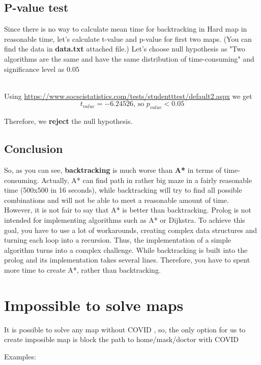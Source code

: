 \documentclass{article}
\newcommand{\C}{COVID }
\begin{document}
\subsection{P-value test}
Since there is no way to calculate mean time for backtracking in Hard map in reasonable time, let's calculate t-value and p-value for first two maps. (You can find the data in \textbf{data.txt} attached file.)
Let's choose null hypothesis as "Two algorithms are the same and have the same distribution of time-consuming" and significance level as $0.05$

\\
Using \url{https://www.socscistatistics.com/tests/studentttest/default2.aspx} we get $$t_{value} = -6.24526 \text{, so }p_{value} < 0.05$$

Therefore, we \textbf{reject} the null hypothesis.

\subsection{Conclusion}

So, as you can see, \textbf{backtracking} is much worse than \textbf{A*} in terms of time-consuming. Actually, A* can find path in rather big maze in a fairly reasonable time (500x500 in 16 seconds), while backtracking will try to find all possible combinations and will not be able to meet a reasonable amount of time.
\\
However, it is not fair to say that A* is better than backtracking. Prolog is not intended for implementing algorithms such as A* or Dijkstra. To achieve this goal, you have to use a lot of workarounds, creating complex data structures and turning each loop into a recursion. Thus, the implementation of a simple algorithm turns into a complex challenge. While backtracking is built into the prolog and its implementation takes several lines. Therefore, you have to spent more time to create A*, rather than backtracking.

\section{Impossible to solve maps}

It is possible to solve any map without \C, so, the only option for us to create imposible map is block the path to home/mask/doctor with \C

Examples:

\\
\end{document}

